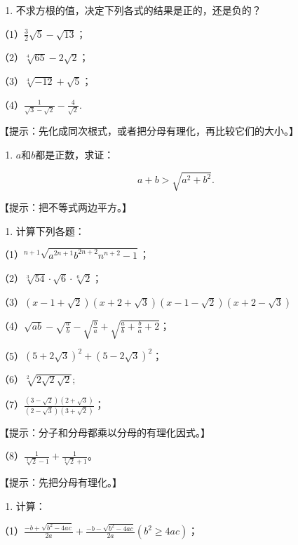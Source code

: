 \begin{enumerate}[start=3]
\item
  不求方根的值，决定下列各式的结果是正的，还是负的？
\end{enumerate}

（1）\(\frac{3}{2}\sqrt{5} - \sqrt{13}\)；

（2）\(\sqrt[4]{65} - 2\sqrt{2}\)；

（3）\(\sqrt[4]{-12} + \sqrt{5}\)；

（4）\(\frac{1}{\sqrt{3} - \sqrt{2}} - \frac{4}{\sqrt{2}}.\)

【提示：先化成同次根式，或者把分母有理化，再比较它们的大小。】

\begin{enumerate}[start=4]
\item
  \(a\)和\(b\)都是正数，求证：
\end{enumerate}

\[
a + b > \sqrt {a ^ {2} + b ^ {2}}.
\]

【提示：把不等式两边平方。】

\begin{enumerate}[start=5]
\item
  计算下列各题：
\end{enumerate}

（1）\(^{n+1}\sqrt{a^{2n+1}b^{2n+2}n^{n+2}-1}\)；

（2）\(\sqrt[3]{54} \cdot \sqrt{6} \cdot \sqrt[6]{2}\)；

（3）\((x - 1 + \sqrt{2})(x + 2 + \sqrt{3})(x - 1 - \sqrt{2})(x + 2 - \sqrt{3})\)

（4）\(\sqrt{ab} - \sqrt{\frac{a}{b}} - \sqrt{\frac{b}{a}} + \sqrt{\frac{a}{b} + \frac{b}{a} + 2}\)；

（5）\((5 + 2\sqrt{3})^2 + (5 - 2\sqrt{3})^2\)；

（6）\(\sqrt[2]{2\sqrt{2}\sqrt{2}};\)

（7）\(\frac{(3 - \sqrt{2})(2 + \sqrt{3})}{(2 - \sqrt{3})(3 + \sqrt{2})}\)；

【提示：分子和分母都乘以分母的有理化因式。】

（8）\(\frac{1}{\sqrt[3]{2} - 1} + \frac{1}{\sqrt[3]{2} + 1}\)。

【提示：先把分母有理化。】

\begin{enumerate}[start=6]
\item
  计算：
\end{enumerate}

（1）\(\frac{-b + \sqrt{b^2 - 4ac}}{2a} + \frac{-b - \sqrt{b^2 - 4ac}}{2a} (b^2 \geqslant 4ac)\)；

